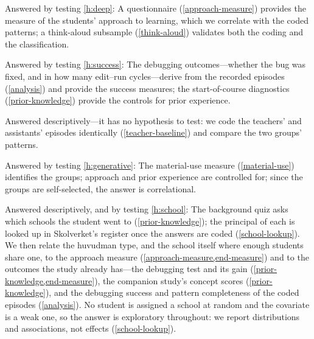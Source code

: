 \rqdeep*
Answered by testing \cref{h:deep}:
\hdeep*
A questionnaire (\cref{approach-measure}) provides the measure of the
students' approach to learning, which we correlate with the coded
patterns; a think-aloud subsample (\cref{think-aloud}) validates both
the coding and the classification.

\rqsuccess*
Answered by testing \cref{h:success}:
\hsuccess*
The debugging outcomes---whether the bug was fixed, and in how many
edit--run cycles---derive from the recorded episodes (\cref{analysis}) and
provide the success measures; the start-of-course diagnostics
(\cref{prior-knowledge}) provide the controls for prior experience.

\rqexperts*
Answered descriptively---it has no hypothesis to test: we code the
teachers' and assistants' episodes identically (\cref{teacher-baseline})
and compare the two groups' patterns.

\rqgenerative*
Answered by testing \cref{h:generative}:
\hgenerative*
The material-use measure (\cref{material-use}) identifies the groups;
approach and prior experience are controlled for; since the groups are
self-selected, the answer is correlational.

\rqschool*
Answered descriptively, and by testing \cref{h:school}:
\hschool*
The background quiz asks which schools the student went to
(\cref{prior-knowledge}); the principal of each is looked up in
Skolverket's register once the answers are coded (\cref{school-lookup}).
We then relate the huvudman type, and the school itself where enough
students share one, to the approach measure
(\cref{approach-measure,end-measure}) and to the outcomes the study
already has---the debugging test and its gain
(\cref{prior-knowledge,end-measure}), the companion study's concept
scores (\cref{prior-knowledge}), and the debugging success and pattern
completeness of the coded episodes (\cref{analysis}).
No student is assigned a school at random and the covariate is a weak
one, so the answer is exploratory throughout: we report distributions
and associations, not effects (\cref{school-lookup}).


